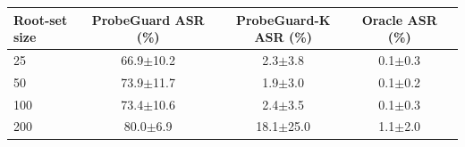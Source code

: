 \begin{tabular}{@{}lcccc@{}}
\toprule
Root-set size & ProbeGuard ASR (\%) & ProbeGuard-K ASR (\%) & Oracle ASR (\%)\\
\midrule
25 & 66.9$\pm$10.2 & 2.3$\pm$3.8 & 0.1$\pm$0.3\\
50 & 73.9$\pm$11.7 & 1.9$\pm$3.0 & 0.1$\pm$0.2\\
100 & 73.4$\pm$10.6 & 2.4$\pm$3.5 & 0.1$\pm$0.3\\
200 & 80.0$\pm$6.9 & 18.1$\pm$25.0 & 1.1$\pm$2.0\\
\bottomrule
\end{tabular}